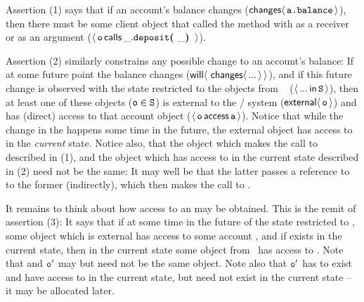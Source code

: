  
Assertion (1) %
says that if   an account's balance changes
($\Changes{\prg{a.balance}}$),
then there must be some client object 
that %
called the  method with  as a receiver or as an argument 
($\Calls{\prg{o}} {\prg{deposit}} {\_} {\_}$).
 
Assertion (2) similarly constrains any possible change to an 
account's balance: 
If at some future point the balance changes  (${\Future{\,\Changes{...}}}$),  %
and if this future change is observed with the state restricted to the objects from \SF~ (\ie $\Using{...}{\prg{S}}$), then 
at least one of these objects ($\prg{o}\in\SF$) is external to the / system ($\External{\prg{o}}$) and 
has (direct) access to that account object
($\CanAccess{\prg{o}}{\prg{a}}$).
Notice that while the change in the  happens some time in the future,
the external object  has access to  in the \emph{current} state.
Notice also, that the object which makes the call to  described in (1), and the object which 
has access to  in the current state described in (2) need not be the same: It may well be that the
latter passes  a reference to  to the former (indirectly), which then makes the call
to .

It remains to think about how access to an  may be obtained. This is the remit of assertion (3): 
It says that if at some time in the future of the state restricted to \SF, 
some object  which is external has access to some account , and if  exists in the 
current state, then in the current state some object 
from \SF~has access to . Note that  and $\prg{o}'$ may but need not be the same object. Note also
that $\prg{o}'$ has to exist and have access to  in the current state, but 
 need not exist in the current state -- it may be allocated later.

\vspace{.1cm}

